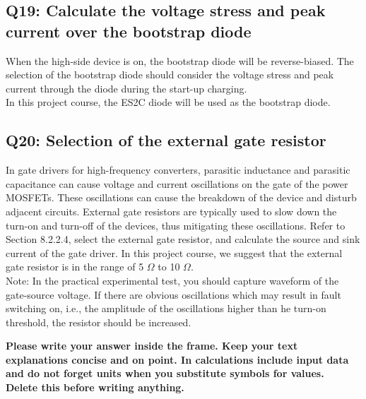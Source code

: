 \documentclass{PELsmallreport}
\begin{document}
 \quad {} \hfill{}

\subsection{Q19: Calculate the voltage stress and peak current over the bootstrap diode}
When the high-side device is on, the bootstrap diode will be reverse-biased. The selection of the bootstrap diode should consider the voltage stress and peak current through the diode during the start-up charging.\\

In this project course, the ES2C diode will be used as the bootstrap diode.\\

 \quad{} \quad \hfill{}

\subsection{Q20: Selection of the external gate resistor}
In gate drivers for high-frequency converters, parasitic inductance and parasitic capacitance can cause voltage and current oscillations on the gate of the power MOSFETs. These oscillations can cause the breakdown of the device and disturb adjacent circuits. External gate resistors are typically used to slow down the turn-on and turn-off of the devices, thus mitigating these oscillations. Refer to Section 8.2.2.4, select the external gate resistor, and calculate the source and sink current of the gate driver. In this project course, we suggest that the external gate resistor is in the range of 5 $\Omega$ to 10 $\Omega$. \\

Note: In the practical experimental test, you should capture waveform of the gate-source voltage. If there are obvious oscillations which may result in fault switching on, i.e., the amplitude of the oscillations higher than he turn-on threshold, the resistor should be increased. 
\begin{framed}
	\vspace{2em}
	\textbf{Please write your answer inside the frame. Keep your text explanations concise and on point. In calculations include input data and do not forget units when you substitute symbols for values. \\ Delete this before writing anything.}
	\vspace{2em}
\end{framed}
 \quad {}\quad {}\quad {}\quad {}\hfill{}
\end{document}
